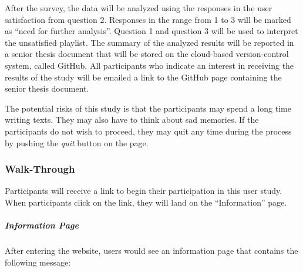 After the survey, the data will be analyzed using the responses in the user satisfaction
from question 2. Responses in the range from 1 to 3 will be marked as “need for
further analysis”. Question 1 and question 3 will be used to interpret the unsatisfied
playlist. The summary of the analyzed results will be reported in a senior thesis
document that will be stored on the cloud-based version-control system, called GitHub.
All participants who indicate an interest in receiving the results of the study
will be emailed a link to the GitHub page containing the senior thesis document.

The potential risks of this study is that the participants may spend a long time
writing texts. They  may also have to think about sad memories. If the participants
do not wish to proceed, they may quit any time during the process by pushing the
\emph{quit} button on the page.

\subsubsection{Walk-Through}

Participants will receive a link to begin their participation in this user study.
When participants click on the link, they will land on the “Information” page.

\subparagraph{Information Page}

After entering the website, users would see an information page that contains the
following message:

